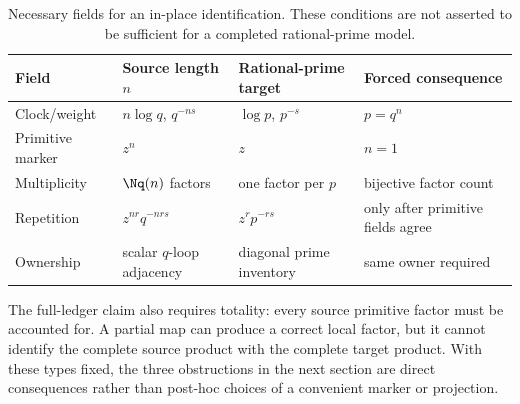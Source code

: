 \begin{table}[t]
\centering
\small
\caption{Necessary fields for an in-place identification. These conditions
are not asserted to be sufficient for a completed rational-prime model.}
\label{tab:necessary-fields}
\begin{tabularx}{\textwidth}{@{}
  >{\raggedright\arraybackslash}p{}
  >{\raggedright\arraybackslash}p{}
  >{\raggedright\arraybackslash}p{}Y@{}}
\toprule
Field & Source length $n$ & Rational-prime target & Forced consequence \\
\midrule
Clock/weight & $n\log q$, $q^{-ns}$ & $\log p$, $p^{-s}$ & $p=q^n$ \\
Primitive marker & $z^n$ & $z$ & $n=1$ \\
Multiplicity & $\Nq(n)$ factors & one factor per $p$ & bijective factor count \\
Repetition & $z^{nr}q^{-nrs}$ & $z^rp^{-rs}$ & only after primitive fields agree \\
Ownership & scalar $q$-loop adjacency & diagonal prime inventory & same owner required \\
\bottomrule
\end{tabularx}
\end{table}

The full-ledger claim also requires totality: every source primitive factor
must be accounted for. A partial map can produce a correct local factor, but
it cannot identify the complete source product with the complete target
product. With these types fixed, the three obstructions in the next section
are direct consequences rather than post-hoc choices of a convenient marker
or projection.

